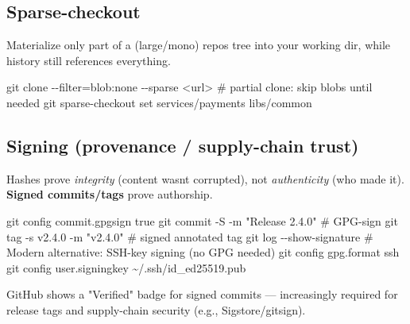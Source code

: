 \documentclass[11pt]{article}
\newenvironment{Shaded}{\begin{snugshade}}{\end{snugshade}}
\newcommand{\AttributeTok}[1]{\textcolor[rgb]{0.16,0.50,0.73}{#1}}
\newcommand{\CommentTok}[1]{\textcolor[rgb]{0.48,0.49,0.49}{#1}}
\newcommand{\FunctionTok}[1]{\textcolor[rgb]{0.56,0.27,0.68}{#1}}
\newcommand{\NormalTok}[1]{\textcolor[rgb]{0.81,0.81,0.76}{#1}}
\newcommand{\OperatorTok}[1]{\textcolor[rgb]{0.81,0.81,0.76}{#1}}
\newcommand{\StringTok}[1]{\textcolor[rgb]{0.96,0.31,0.31}{#1}}
\begin{document}
\subsection{Sparse-checkout}\label{sparse-checkout}

Materialize only part of a (large/mono) repo\textquotesingle s tree into your working dir, while history still references everything.


\begin{Shaded}
\begin{Highlighting}[]
\FunctionTok{git}\NormalTok{ clone }\AttributeTok{{-}{-}filter}\OperatorTok{=}\NormalTok{blob:none }\AttributeTok{{-}{-}sparse} \OperatorTok{\textless{}}\NormalTok{url}\OperatorTok{\textgreater{}}   \CommentTok{\# partial clone: skip blobs until needed}
\FunctionTok{git}\NormalTok{ sparse{-}checkout set services/payments libs/common}
\end{Highlighting}
\end{Shaded}

\subsection{Signing (provenance / supply-chain trust)}\label{signing-provenance--supply-chain-trust}

Hashes prove \emph{integrity} (content wasn\textquotesingle t corrupted), not \emph{authenticity} (who made it). \textbf{Signed commits/tags} prove authorship.


\begin{Shaded}
\begin{Highlighting}[]
\FunctionTok{git}\NormalTok{ config commit.gpgsign true}
\FunctionTok{git}\NormalTok{ commit }\AttributeTok{{-}S} \AttributeTok{{-}m} \StringTok{"Release 2.4.0"}          \CommentTok{\# GPG{-}sign}
\FunctionTok{git}\NormalTok{ tag }\AttributeTok{{-}s}\NormalTok{ v2.4.0 }\AttributeTok{{-}m} \StringTok{"v2.4.0"}             \CommentTok{\# signed annotated tag}
\FunctionTok{git}\NormalTok{ log }\AttributeTok{{-}{-}show{-}signature}
\CommentTok{\# Modern alternative: SSH{-}key signing (no GPG needed)}
\FunctionTok{git}\NormalTok{ config gpg.format ssh}
\FunctionTok{git}\NormalTok{ config user.signingkey \textasciitilde{}/.ssh/id\_ed25519.pub}
\end{Highlighting}
\end{Shaded}

GitHub shows a "Verified" badge for signed commits --- increasingly required for release tags and supply-chain security (e.g., Sigstore/gitsign).
\end{document}
